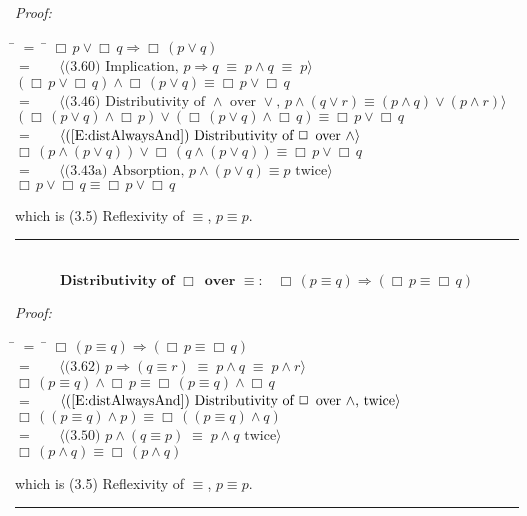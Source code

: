 \documentclass[fleqn, leqno]{article}
\newcommand{\lgap}{2pt}                             %
\newcommand{\mymathindent}{24pt}                    %
\newcommand{\equivs}{\ensuremath{\;\equiv\;}}       %
\newcommand{\impl}{\ensuremath{\Rightarrow}}        %
\newcommand{\Always}{\Box\,}
\newcommand{\myqed}{\hfill\rule[-.23ex]{1.2ex}{2.0ex}}
\newcommand{\Gll} {\langle}                         %
\newcommand{\Ggg} {\rangle}                         %
\newcommand{\Hint}[1]     {\ \ \ $\Gll              \mbox{#1} \Ggg$ }   %
\begin{document}
\emph{Proof:}
\begin{tabbing}
\hspace{\mymathindent} \= $= \;$ \= \kill
  \> \>   $\Always p \lor \Always q \impl \Always(p \lor q)$\\[\lgap]
  \> $=$  \>  \Hint{(3.60) Implication, $p\impl q \equivs p\land q \equivs p$}\\[\lgap]
  \> \>   $(\Always p \lor \Always q) \land \Always(p \lor q) \equiv \Always p \lor \Always q$\\[\lgap]
  \> $=$  \>  \Hint{(3.46) Distributivity of $\land$ over $\lor$, $p\land (q\lor r)\equiv (p\land q)\lor (p\land r)$}\\[\lgap]
  \> \>   $(\Always (p \lor q) \land \Always p) \lor (\Always (p \lor q) \land \Always q) \equiv \Always p \lor \Always q$\\[\lgap]
  \> $=$  \>  \Hint{(\ref{E:distAlwaysAnd}) Distributivity of $\Always$ over $\land$}\\[\lgap]
  \> \>   $\Always(p \land (p \lor q)) \lor \Always(q \land (p \lor q)) \equiv \Always p \lor \Always q$\\[\lgap]
  \> $=$  \>  \Hint{(3.43a) Absorption, $p \land (p \lor q) \equiv p$ twice}\\[\lgap]
  \> \>   $\Always p \lor \Always q \equiv \Always p \lor \Always q$
\end{tabbing}
which is (3.5) Reflexivity of $\equiv$, $p\equiv p$. \myqed\\[\lgap]

\begin{equation}\label{E:distAlwaysEquiv}
\textbf{Distributivity of $\Always$ over $\equiv$:}\quad \Always (p \equiv q) \impl (\Always p \equiv \Always q)
\end{equation}

\emph{Proof:}
\begin{tabbing}
\hspace{\mymathindent} \= $= \;$ \= \kill
  \> \>   $\Always (p \equiv q) \impl (\Always p \equiv \Always q)$\\[\lgap]
  \> $=$  \>  \Hint{(3.62) $p\impl (q\equiv r) \equivs p\land q\equivs p\land r$}\\[\lgap]
  \> \>   $\Always (p \equiv q) \land \Always p \equiv \Always (p \equiv q) \land \Always q$\\[\lgap]
  \> $=$  \>  \Hint{(\ref{E:distAlwaysAnd}) Distributivity of $\Always$ over $\land$, twice}\\[\lgap]
  \> \>   $\Always((p \equiv q) \land p) \equiv \Always((p \equiv q) \land q)$\\[\lgap]
  \> $=$  \>  \Hint{(3.50) $p\land (q\equiv p)\equivs p\land q$ twice}\\[\lgap]
  \> \>   $\Always(p \land q) \equiv \Always (p \land q)$
\end{tabbing}
which is (3.5) Reflexivity of $\equiv$, $p\equiv p$. \myqed\\[\lgap]
\end{document}

